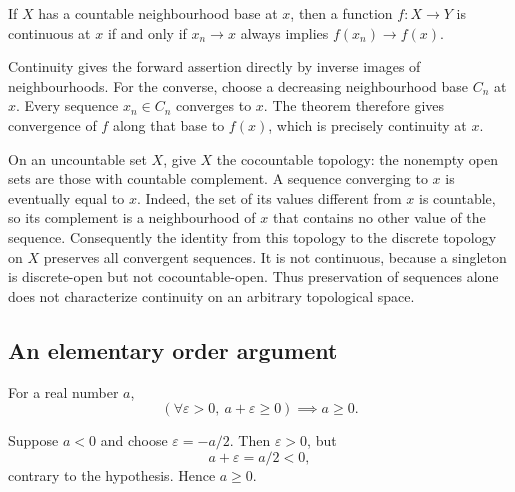\begin{corollary}
If $X$ has a countable neighbourhood base at $x$, then a function
$f:X\to Y$ is continuous at $x$ if and only if
$x_n\to x$ always implies $f(x_n)\to f(x)$.
\end{corollary}
\Proof
Continuity gives the forward assertion directly by inverse images of
neighbourhoods. For the converse, choose a decreasing neighbourhood
base $C_n$ at $x$. Every sequence $x_n\in C_n$ converges to $x$.
The theorem therefore gives convergence of $f$ along that base to
$f(x)$, which is precisely continuity at $x$.
\Done

\begin{example}
On an uncountable set $X$, give $X$ the cocountable topology: the
nonempty open sets are those with countable complement. A sequence
converging to $x$ is eventually equal to $x$. Indeed, the set of its
values different from $x$ is countable, so its complement is a
neighbourhood of $x$ that contains no other value of the sequence.
Consequently the identity from this topology to the discrete topology
on $X$ preserves all convergent sequences. It is not continuous,
because a singleton is discrete-open but not cocountable-open.
Thus preservation of sequences alone does not characterize continuity
on an arbitrary topological space.
\end{example}

\subsection{An elementary order argument}
\begin{theorem}
For a real number $a$,
\[
(\forall \varepsilon>0,\ a+\varepsilon\geqslant0)
\implies a\geqslant0.
\]
\end{theorem}
\Proof
Suppose $a<0$ and choose $\varepsilon=-a/2$. Then $\varepsilon>0$, but
\[
a+\varepsilon=a/2<0,
\]
contrary to the hypothesis. Hence $a\geqslant0$.
\Done

